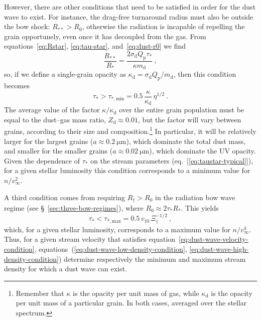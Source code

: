 \message{ !name(dusty-bow-wave.tex)}\documentclass[useAMS, usenatbib, a4paper]{mnras}
\newcommand\Qp{\ensuremath{Q_{\text{p}}}}
\newcommand{\grain}{\ensuremath{_{\text{d}}}}
\newcommand\starstar{\ensuremath{_{**}}}
\begin{document}
However, there are other conditions that need to be satisfied in order
for the dust wave to exist.  For instance, the drag-free turnaround
radius must also be outside the bow shock: \(R\starstar > R_0\),
otherwise the radiation is incapable of repelling the grain
opportunely, even once it has decoupled from the gas.  From
equations~\eqref{eq:Rstar}, \eqref{eq:tau-star},
and~\eqref{eq:dust-r0} we find
\begin{equation}
  \label{eq:Rstarstar-over-Rstar}
  \frac{R\starstar}{R_*} = \frac{2 \sigma\grain \Qp \tau_*}{\kappa m\grain} \ , 
\end{equation}
so, if we define a single-grain opacity as
\(\kappa\grain = \sigma\grain \Qp / m\grain\), then this condition becomes
\begin{equation}
  \label{eq:dust-wave-low-density-condition}
  \tau_* >  \tau_{*,\text{min}} = 0.5\, \frac{\kappa}{\kappa\grain}\, \eta^{1/2} 
  \ . 
\end{equation}
The average value of the factor \(\kappa / \kappa\grain\) over the entire grain
population must be equal to the dust--gas mass ratio,
\(Z\grain \approx 0.01\), but the factor will vary between grains, according
to their size and composition.\footnote{%
  Remember that \(\kappa\) is the opacity per unit mass of gas, while
  \(\kappa\grain\) is the opacity per unit mass of a particular grain. In
  both cases, averaged over the stellar spectrum.} %
In particular, it will be relatively larger for the largest grains
(\(a \approx \SI{0.2}{\um}\)), which dominate the total dust mass, and
smaller for the smaller grains (\(a \approx \SI{0.02}{\um}\)), which
dominate the UV opacity.  Given the dependence of \(\tau_*\) on the
stream parameters (eq.~[\ref{eq:taustar-typical}]), for a given
stellar luminosity this condition corresponds to a minimum value for
\(n / v_\infty^2\).

A third condition comes from requiring \(R_\dag > R_0\) in the radiation
bow wave regime (see \S~\ref{sec:three-bow-regimes}), where
\(R_0 \approx 2 \tau_* R_*\).  This yields
\begin{equation}
  \label{eq:dust-wave-high-density-condition}
  \tau_* < \tau_{*,\text{max}} = 0.5\, v_{10}\, \Xi_\dag^{-1/2} \ , 
\end{equation}
which, for a given stellar luminosity, corresponds to a maximum value
for \(n / v_\infty^4\).  Thus, for a given stream velocity that satisfies
equation~\eqref{eq:dust-wave-velocity-condition},
equations~(\ref{eq:dust-wave-low-density-condition},
\ref{eq:dust-wave-high-density-condition}) determine respectively the
minimum and maximum stream density for which a dust wave can exist.
\end{document}
